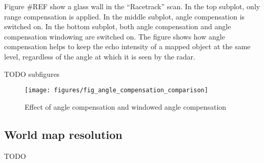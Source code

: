Figure \#REF show a glass wall in the ``Racetrack'' scan. In the top
subplot, only range compensation is applied. In the middle subplot,
angle compensation is switched on. In the bottom subplot, both angle
compensation and angle compensation windowing are switched on. The
figure shows how angle compensation helps to keep the echo intensity of
a mapped object at the same level, regardless of the angle at which it
is seen by the radar.

TODO subfigures
\begin{figure}[htp]
    \centering
    \label{fig:fig_angle_compensation_comparison}
    \texttt{[image: figures/fig\_angle\_compensation\_comparison]}
    \caption{Effect of angle compensation and windowed angle compensation}
\end{figure}

\subsection{World map resolution}\label{world-map-resolution}
TODO
